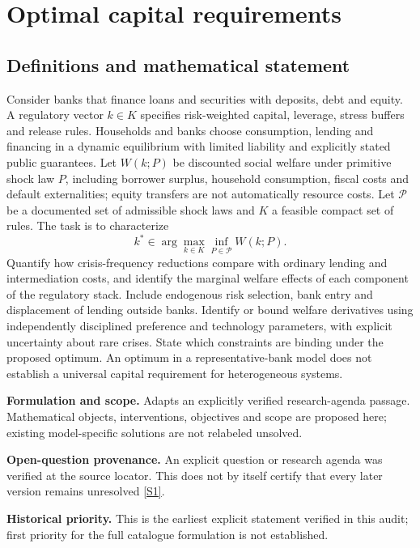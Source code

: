 \documentclass[11pt]{article}
\newcommand{\sref}[2]{\hyperlink{source:#1:#2}{[S#2]}}
\begin{document}
\section*{Optimal capital requirements}\label{30007602}
\subsection{Definitions and mathematical statement}
Consider banks that finance loans and securities with deposits, debt and equity. A regulatory vector \(k\in K\) specifies risk-weighted capital, leverage, stress buffers and release rules. Households and banks choose consumption, lending and financing in a dynamic equilibrium with limited liability and explicitly stated public guarantees. Let \(W(k;P)\) be discounted social welfare under primitive shock law \(P\), including borrower surplus, household consumption, fiscal costs and default externalities; equity transfers are not automatically resource costs. Let \(\mathcal P\) be a documented set of admissible shock laws and \(K\) a feasible compact set of rules. The task is to characterize
\[k^*\in\arg\max_{k\in K}\inf_{P\in\mathcal P}W(k;P).\]
Quantify how crisis-frequency reductions compare with ordinary lending and intermediation costs, and identify the marginal welfare effects of each component of the regulatory stack. Include endogenous risk selection, bank entry and displacement of lending outside banks. Identify or bound welfare derivatives using independently disciplined preference and technology parameters, with explicit uncertainty about rare crises. State which constraints are binding under the proposed optimum. An optimum in a representative-bank model does not establish a universal capital requirement for heterogeneous systems.

\par\textbf{Formulation and scope.} Adapts an explicitly verified research-agenda passage. Mathematical objects, interventions, objectives and scope are proposed here; existing model-specific solutions are not relabeled unsolved.

\par\textbf{Open-question provenance.} An explicit question or research agenda was verified at the source locator. This does not by itself certify that every later version remains unresolved \sref{30007602}{1}.

\par\textbf{Historical priority.} This is the earliest explicit statement verified in this audit; first priority for the full catalogue formulation is not established.
\end{document}
